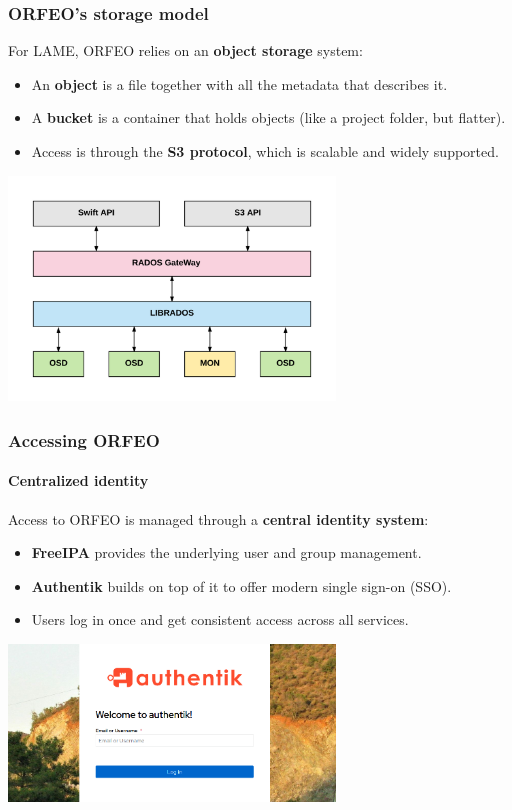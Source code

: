 \documentclass{beamer}
\begin{document}
	\begin{frame}
		\frametitle{ORFEO’s storage model}
		
		For LAME, ORFEO relies on an \textbf{object storage} system:
		
		\begin{itemize}
			\item An \textbf{object} is a file together with all the metadata that describes it.
			\item A \textbf{bucket} is a container that holds objects (like a project folder, but flatter).
			\item Access is through the \textbf{S3 protocol}, which is scalable and widely supported.
		\end{itemize}
		
		\centering
		\includegraphics[width=0.65\textwidth]{otherResources/CEPH_RGW_diagram.png} %
	\end{frame}
		
	\begin{frame}
		\frametitle{Accessing ORFEO}
		\framesubtitle{Centralized identity}
		
		Access to ORFEO is managed through a \textbf{central identity system}:
		
		\begin{itemize}
			\item \textbf{FreeIPA} provides the underlying user and group management.
			\item \textbf{Authentik} builds on top of it to offer modern single sign-on (SSO).
			\item Users log in once and get consistent access across all services.
		\end{itemize}
		
		\vspace{1em}
		\centering
		\includegraphics[width=0.65\textwidth]{otherResources/authentik_login.png} %
	\end{frame}
	
\end{document}
